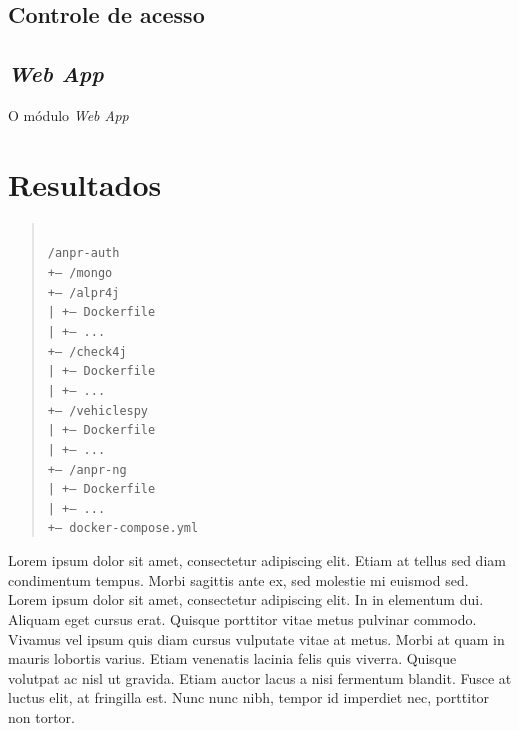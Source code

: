 \documentclass[12pt]{article}
\begin{document}
\subsection{Controle de acesso}


\subsection{\textit{Web App}}

O módulo \textit{Web App} 






\section{Resultados} 

\begin{quotation}
	\texttt{\\
		/anpr-auth\\
		+-- /mongo\\
		+-- /alpr4j\\
		|   +-- Dockerfile\\
		|   +-- ...\\
		+-- /check4j\\
		|   +-- Dockerfile\\
		|   +-- ...\\
		+-- /vehiclespy\\
		|   +-- Dockerfile\\
		|   +-- ...\\
		+-- /anpr-ng\\
		|   +-- Dockerfile\\
		|   +-- ...\\
		+-- docker-compose.yml\\}
\end{quotation}

Lorem ipsum dolor sit amet, consectetur adipiscing elit. Etiam at tellus sed diam condimentum tempus. Morbi sagittis ante ex, sed molestie mi euismod sed. Lorem ipsum dolor sit amet, consectetur adipiscing elit. In in elementum dui. Aliquam eget cursus erat. Quisque porttitor vitae metus pulvinar commodo. Vivamus vel ipsum quis diam cursus vulputate vitae at metus. Morbi at quam in mauris lobortis varius. Etiam venenatis lacinia felis quis viverra. Quisque volutpat ac nisl ut gravida. Etiam auctor lacus a nisi fermentum blandit. Fusce at luctus elit, at fringilla est. Nunc nunc nibh, tempor id imperdiet nec, porttitor non tortor.
\end{document}
